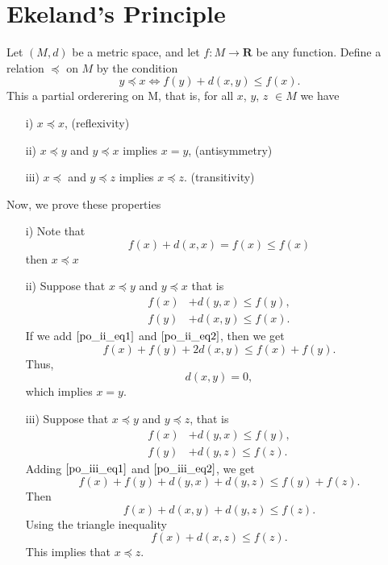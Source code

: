 \section{Ekeland's Principle}
    
    Let $(M,d)$ be a metric space, and let $f : M \to \mathbf{R}$ be any 
    function.
    Define a relation $\preceq$ on $M$ by the condition 
    $$
        y \preceq x \iff f(y) + d(x,y) \leq f(x).
    $$
    This a partial orderering on M, that is, for all $x$, $y$, $z$ $\in M$ we 
    have
    \begin{itemize}
        \item[i)] $x \preceq x$, (reflexivity)
        \item[ii)] $x \preceq y$ and $y \preceq x$ implies $x = y$, 
        (antisymmetry)
        \item[iii)] $x \preceq$ and $y \preceq z$ implies $x \preceq z$. %
            (transitivity)
    \end{itemize}
    Now, we prove these properties
    \begin{itemize}
        \item[i)]
            Note that 
            $$
                f(x) + d(x,x) = f(x) \leq f(x)
            $$
            then $x \preceq x$
        \item[ii)]
            Suppose that $x \preceq y$ and $y \preceq x$ that is
            \begin{align}
                f(x) &+ d(y, x) \leq f(y), \label{po_ii_eq1}\\
                f(y) &+ d(x, y) \leq f(x). \label{po_ii_eq2}
            \end{align}
            If we add $\eqref{po_ii_eq1}$ and $\eqref{po_ii_eq2}$, then we get
            $$
                f(x) + f(y) + 2 d(x,y) \leq f(x) + f(y).
            $$
            Thus,
            $$
                d(x, y) = 0,
            $$
            which implies $x = y$.
        \item[iii)]
            Suppose that $ x \preceq y$ and $y \preceq z$, that is
            \begin{align}
                f(x) &+ d(y, x) \leq f(y), \label{po_iii_eq1}\\
                f(y) &+ d(y, z) \leq f(z). \label{po_iii_eq2}  
            \end{align}
            Adding $\eqref{po_iii_eq1}$ and $\eqref{po_iii_eq2}$, we get
            $$
                f(x) + f(y) + d(y,x) + d(y, z) \leq f(y) + f(z).
            $$
            Then
            $$
                f(x) + d(x,y) + d(y, z) \leq f(z).
            $$
            Using the triangle inequality 
            $$
                f(x) + d(x, z) \leq f(z).
            $$
            This implies that $x \preceq z$.
    \end{itemize}
